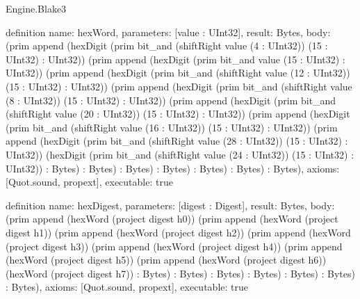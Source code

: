 \begin{lexlean}{Engine.Blake3}
\begin{semanticmodule}
definition{
  name: hexWord,
  parameters: [value : UInt32],
  result: Bytes,
  body: (prim append (hexDigit (prim bit_and (shiftRight value (4 : UInt32)) (15 : UInt32) : UInt32)) (prim append (hexDigit (prim bit_and value (15 : UInt32) : UInt32)) (prim append (hexDigit (prim bit_and (shiftRight value (12 : UInt32)) (15 : UInt32) : UInt32)) (prim append (hexDigit (prim bit_and (shiftRight value (8 : UInt32)) (15 : UInt32) : UInt32)) (prim append (hexDigit (prim bit_and (shiftRight value (20 : UInt32)) (15 : UInt32) : UInt32)) (prim append (hexDigit (prim bit_and (shiftRight value (16 : UInt32)) (15 : UInt32) : UInt32)) (prim append (hexDigit (prim bit_and (shiftRight value (28 : UInt32)) (15 : UInt32) : UInt32)) (hexDigit (prim bit_and (shiftRight value (24 : UInt32)) (15 : UInt32) : UInt32)) : Bytes) : Bytes) : Bytes) : Bytes) : Bytes) : Bytes) : Bytes),
  axioms: [Quot.sound, propext],
  executable: true
}

definition{
  name: hexDigest,
  parameters: [digest : Digest],
  result: Bytes,
  body: (prim append (hexWord (project digest h0)) (prim append (hexWord (project digest h1)) (prim append (hexWord (project digest h2)) (prim append (hexWord (project digest h3)) (prim append (hexWord (project digest h4)) (prim append (hexWord (project digest h5)) (prim append (hexWord (project digest h6)) (hexWord (project digest h7)) : Bytes) : Bytes) : Bytes) : Bytes) : Bytes) : Bytes) : Bytes),
  axioms: [Quot.sound, propext],
  executable: true
}
\end{semanticmodule}
\end{lexlean}

